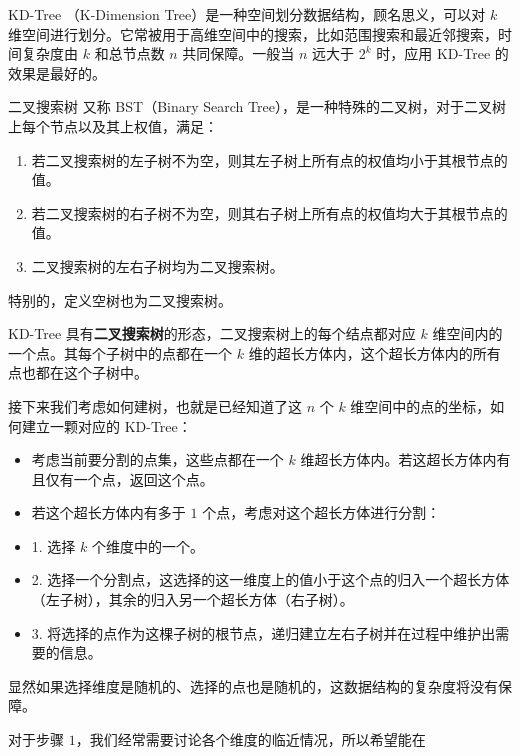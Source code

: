 
KD-Tree （K-Dimension Tree）是一种空间划分数据结构，顾名思义，可以对 $k$ 维空间进行划分。它常被用于高维空间中的搜索，比如范围搜索和最近邻搜索，时间复杂度由 $k$ 和总节点数 $n$ 共同保障。一般当 $n$ 远大于 $2^k$ 时，应用 KD-Tree 的效果是最好的。

\begin{definition}{二叉搜索树}
又称 BST（Binary Search Tree），是一种特殊的二叉树，对于二叉树上每个节点以及其上权值，满足：
\begin{enumerate}
\item 若二叉搜索树的左子树不为空，则其左子树上所有点的权值均小于其根节点的值。
\item 若二叉搜索树的右子树不为空，则其右子树上所有点的权值均大于其根节点的值。
\item 二叉搜索树的左右子树均为二叉搜索树。
\end{enumerate}
特别的，定义空树也为二叉搜索树。
\end{definition}

KD-Tree 具有\textbf{二叉搜索树}的形态，二叉搜索树上的每个结点都对应 $k$ 维空间内的一个点。其每个子树中的点都在一个 $k$ 维的超长方体内，这个超长方体内的所有点也都在这个子树中。

接下来我们考虑如何建树，也就是已经知道了这 $n$ 个 $k$ 维空间中的点的坐标，如何建立一颗对应的 KD-Tree：

\begin{itemize}
\item 考虑当前要分割的点集，这些点都在一个 $k$ 维超长方体内。若这超长方体内有且仅有一个点，返回这个点。
\item 若这个超长方体内有多于 $1$ 个点，考虑对这个超长方体进行分割：
\item 1. 选择 $k$ 个维度中的一个。
    \item 2. 选择一个分割点，这选择的这一维度上的值小于这个点的归入一个超长方体（左子树），其余的归入另一个超长方体（右子树）。
    \item 3. 将选择的点作为这棵子树的根节点，递归建立左右子树并在过程中维护出需要的信息。
\end{itemize}

显然如果选择维度是随机的、选择的点也是随机的，这数据结构的复杂度将没有保障。

对于步骤 $1$，我们经常需要讨论各个维度的临近情况，所以希望能在 $$